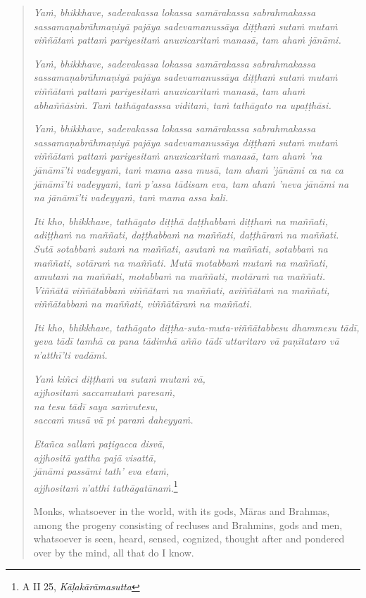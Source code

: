 \begin{quote}
\emph{Yaṁ, bhikkhave, sadevakassa lokassa samārakassa sabrahmakassa sassamaṇabrāhmaṇiyā pajāya sadevamanussāya diṭṭhaṁ sutaṁ mutaṁ viññātaṁ pattaṁ pariyesitaṁ anuvicaritaṁ manasā, tam ahaṁ jānāmi.}

\emph{Yaṁ, bhikkhave, sadevakassa lokassa samārakassa sabrahmakassa sassamaṇabrāhmaṇiyā pajāya sadevamanussāya diṭṭhaṁ sutaṁ mutaṁ viññātaṁ pattaṁ pariyesitaṁ anuvicaritaṁ manasā, tam ahaṁ abhaññāsiṁ. Taṁ tathāgatasssa viditaṁ, taṁ tathāgato na upaṭṭhāsi.}

\emph{Yaṁ, bhikkhave, sadevakassa lokassa samārakassa sabrahmakassa sassamaṇabrāhmaṇiyā pajāya sadevamanussāya diṭṭhaṁ sutaṁ mutaṁ viññātaṁ pattaṁ pariyesitaṁ anuvicaritaṁ manasā, tam ahaṁ 'na jānāmī'ti vadeyyaṁ, taṁ mama assa musā, tam ahaṁ 'jānāmi ca na ca jānāmī'ti vadeyyaṁ, taṁ p'assa tādisam eva, tam ahaṁ 'neva jānāmi na na jānāmī'ti vadeyyaṁ, taṁ mama assa kali.}

\emph{Iti kho, bhikkhave, tathāgato diṭṭhā daṭṭhabbaṁ diṭṭhaṁ na maññati, adiṭṭhaṁ na maññati, daṭṭhabbaṁ na maññati, daṭṭhāraṁ na maññati. Sutā sotabbaṁ sutaṁ na maññati, asutaṁ na maññati, sotabbaṁ na maññati, sotāraṁ na maññati. Mutā motabbaṁ mutaṁ na maññati, amutaṁ na maññati, motabbaṁ na maññati, motāraṁ na maññati. Viññātā viññātabbaṁ viññātaṁ na maññati, aviññātaṁ na maññati, viññātabbaṁ na maññati, viññātāraṁ na maññati.}

\emph{Iti kho, bhikkhave, tathāgato diṭṭha-suta-muta-viññātabbesu dhammesu tādī, yeva tādī tamhā ca pana tādimhā añño tādī uttaritaro vā paṇītataro vā n'atthī'ti vadāmi.}

\enlargethispage{\baselineskip}

\emph{Yaṁ kiñci diṭṭhaṁ va sutaṁ mutaṁ vā,}\\
\emph{ajjhositaṁ saccamutaṁ paresaṁ,}\\
\emph{na tesu tādī saya saṁvutesu,}\\
\emph{saccaṁ musā vā pi paraṁ daheyyaṁ.}

\emph{Etañca sallaṁ paṭigacca disvā,}\\
\emph{ajjhositā yattha pajā visattā,}\\
\emph{jānāmi passāmi tath' eva etaṁ,}\\
\emph{ajjhositaṁ n'atthi tathāgatānaṁ.}\footnote{A II 25, \emph{Kāḷakārāmasutta}}

Monks, whatsoever in the world, with its gods, Māras and Brahmas, among the progeny consisting of recluses and Brahmins, gods and men, whatsoever is seen, heard, sensed, cognized, thought after and pondered over by the mind, all that do I know.


\end{quote}
